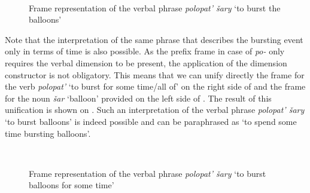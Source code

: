 \begin{figure}
\centering
{}\\
\hfill
\caption{Frame representation of the verbal phrase \textit{polopat' \v{s}ary} `to burst the balloons' \label{frame:burst:balloon}}
\end{figure}

Note that the interpretation of the same phrase that describes the bursting event only in terms of time is also possible. As the prefix frame in case of \textit{po-} only requires the verbal dimension to be present, the application of the dimension constructor is not obligatory. This means that we can unify directly the frame for the verb \textit{polopat'} `to burst for some time/all of' on the right side of  and the frame for the noun \textit{\v{s}ar} `balloon' provided on the left side of . The result of this unification is shown on . Such an interpretation of the verbal phrase \textit{polopat' \v{s}ary} `to burst balloons' is indeed possible and can be paraphrased as `to spend some time bursting balloons'. 

\begin{figure}
\centering
{}\\
\hfill
\caption{Frame representation of the verbal phrase \textit{polopat' \v{s}ary} `to burst balloons for some time' \label{frame:burst:delim}}
\end{figure}

